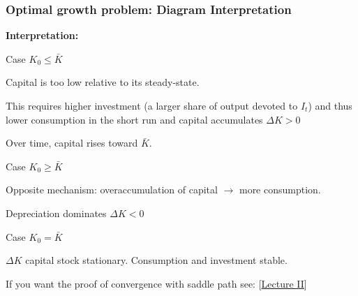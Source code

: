 \documentclass[xcolor=x11names,compress,aspectratio=169]{beamer}%
\makeatletter
\renewenvironment{itemize}{\begin{compactitemize}[<+-| alert@+>]}{\end{compactitemize}}
\makeatother
\begin{document}
\begin{frame}%
%

\frametitle{Optimal growth problem: Diagram Interpretation}%


\textbf{Interpretation:}

\begin{itemize}
\item Case $K_{0}\leq\bar{K}$

\begin{itemize}
\item Capital is too low relative to its steady-state.

\item This requires higher investment (a larger share of output devoted to
$I_{t}$) and thus lower consumption in the short run and capital accumulates
$\Delta K>0$

\item Over time, capital rises toward $\bar{K}$.
\end{itemize}

\item Case $K_{0}\geq\bar{K}$

\begin{itemize}
\item Opposite mechanism: overaccumulation of capital $\rightarrow$ more consumption.

\item Depreciation dominates $\Delta K<0$
\end{itemize}

\item Case $K_{0}=\bar{K}$

\begin{itemize}
\item $\Delta K$ capital stock stationary. Consumption and investment stable.
\end{itemize}
\end{itemize}

If you want the proof of convergence with saddle path see:
[\href{https://olivierloisel.com/macroeconomics/Chapter\%202.pdf}{Lecture II}]%

\transboxout
\end{frame}%
\end{document}
